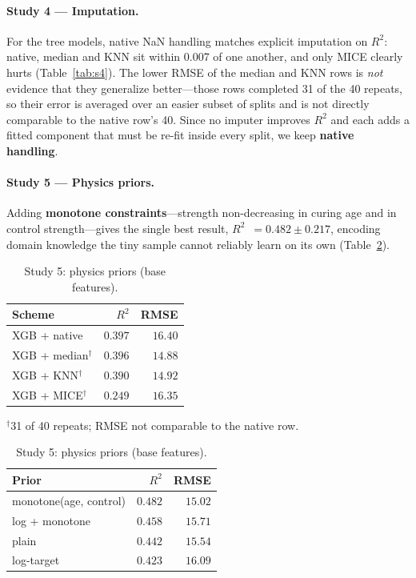 \documentclass[11pt]{article}
\newcommand{\R}{$R^2$}
\begin{document}
\paragraph{Study 4 --- Imputation.}
For the tree models, native NaN handling matches explicit imputation on \R{}: native,
median and KNN sit within 0.007 of one another, and only MICE clearly hurts
(Table~\ref{tab:s4}). The lower RMSE of the median and KNN rows is \emph{not} evidence
that they generalize better---those rows completed 31 of the 40 repeats, so their error
is averaged over an easier subset of splits and is not directly comparable to the
native row's 40. Since no imputer improves \R{} and each adds a fitted component that
must be re-fit inside every split, we keep \textbf{native handling}.

\paragraph{Study 5 --- Physics priors.}
Adding \textbf{monotone constraints}---strength non-decreasing in curing age and in
control strength---gives the single best result, \R{}~$=0.482\pm0.217$, encoding
domain knowledge the tiny sample cannot reliably learn on its own (Table~\ref{tab:s5}).

\begin{table}[H]\centering\small
\begin{minipage}{0.46\textwidth}\centering
\caption{Study 4: imputation (framing C).}
\label{tab:s4}
\begin{tabular}{lrr}
\toprule
Scheme & \R{} & RMSE \\
\midrule
\rowcolor{green!12}XGB + native & $0.397$ & $16.40$ \\
XGB + median$^{\dagger}$ & $0.396$ & $14.88$ \\
XGB + KNN$^{\dagger}$ & $0.390$ & $14.92$ \\
XGB + MICE$^{\dagger}$ & $0.249$ & $16.35$ \\
\bottomrule
\end{tabular}

{\scriptsize $^{\dagger}$31 of 40 repeats; RMSE not comparable to the native row.}
\end{minipage}\hfill
\begin{minipage}{0.5\textwidth}\centering
\caption{Study 5: physics priors (base features).}
\label{tab:s5}
\begin{tabular}{lrr}
\toprule
Prior & \R{} & RMSE \\
\midrule
\rowcolor{green!12}monotone(age, control) & $0.482$ & $15.02$ \\
log + monotone & $0.458$ & $15.71$ \\
plain & $0.442$ & $15.54$ \\
log-target & $0.423$ & $16.09$ \\
\bottomrule
\end{tabular}
\end{minipage}
\end{table}
\end{document}
